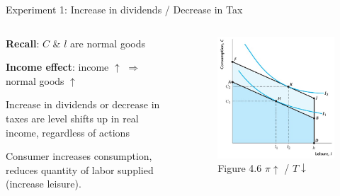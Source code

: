 \documentclass[11pt,aspectratio=169,usenames,dvipsnames]{beamer}
\let\tempone\itemize
\let\temptwo\enditemize
\renewenvironment{itemize}{\tempone\addtolength{\itemsep}{\fill}}{\temptwo}
\begin{document}
\begin{frame}{Experiment 1: Increase in dividends / Decrease in Tax}
\label{slide:Experiment_1__Increase_in_dividends}
    \begin{columns}
        \begin{column}{0.5\textwidth}
            \begin{itemize}
                \item \textbf{Recall}: $ C $ \& $ l $ are normal goods
                \item \textbf{Income effect}: income $ \uparrow  $ $ \Rightarrow  $ normal goods $ \uparrow  $
                \item Increase in dividends or decrease in taxes are level shifts up in real income, regardless of actions
                \item Consumer increases consumption, reduces quantity of labor supplied (increase leisure).
            \end{itemize}
        \end{column}
        \begin{column}{0.5\textwidth}
            \begin{figure}
                \caption{Figure 4.6 $ \pi \uparrow $ / $ T \downarrow  $}
                \includegraphics[width=.8\textwidth]{./figures/Figure4_7.jpg}
            \end{figure}
        \end{column}
    \end{columns}
\end{frame}
\end{document}
